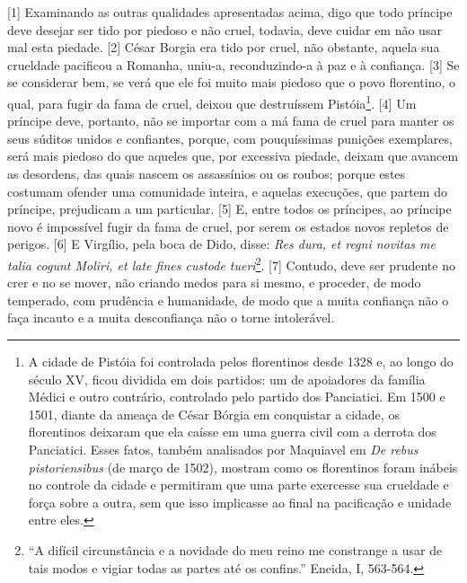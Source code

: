 {[}1{]} Examinando as outras qualidades apresentadas acima, digo que
todo príncipe deve desejar ser tido por piedoso e não cruel, todavia,
deve cuidar em não usar mal esta piedade. {[}2{]} César Borgia era tido
por cruel, não obstante, aquela sua crueldade pacificou a Romanha,
uniu-a, reconduzindo-a à paz e à confiança. {[}3{]} Se se considerar
bem, se verá que ele foi muito mais piedoso que o povo florentino, o
qual, para fugir da fama de cruel, deixou que destruíssem
Pistóia\footnote{A cidade de Pistóia foi controlada pelos florentinos
  desde 1328 e, ao longo do século XV, ficou dividida em dois partidos:
  um de apoiadores da família Médici e outro contrário, controlado pelo
  partido dos Panciatici. Em 1500 e 1501, diante da ameaça de César
  Bórgia em conquistar a cidade, os florentinos deixaram que ela caísse
  em uma guerra civil com a derrota dos Panciatici. Esses fatos, também
  analisados por Maquiavel em \emph{De rebus pistoriensibus} (de março
  de 1502), mostram como os florentinos foram inábeis no controle da
  cidade e permitiram que uma parte exercesse sua crueldade e força
  sobre a outra, sem que isso implicasse ao final na pacificação e
  unidade entre eles.}. {[}4{]} Um príncipe deve, portanto, não se
importar com a má fama de cruel para manter os seus súditos unidos e
confiantes, porque, com pouquíssimas punições exemplares, será mais
piedoso do que aqueles que, por excessiva piedade, deixam que avancem as
desordens, das quais nascem os assassínios ou os roubos; porque estes
costumam ofender uma comunidade inteira, e aquelas execuções, que partem
do príncipe, prejudicam a um particular. {[}5{]} E, entre todos os
príncipes, ao príncipe novo é impossível fugir da fama de cruel, por
serem os estados novos repletos de perigos. {[}6{]} E Virgílio, pela
boca de Dido, disse: \emph{Res dura, et regni novitas me talia cogunt
Moliri, et late fines custode tueri}\footnote{``A difícil circunstância
  e a novidade do meu reino me constrange a usar de tais modos e vigiar
  todas as partes até os confins.'' Eneida, I, 563-564.}. {[}7{]}
Contudo, deve ser prudente no crer e no se mover, não criando medos para
si mesmo, e proceder, de modo temperado, com prudência e humanidade, de
modo que a muita confiança não o faça incauto e a muita desconfiança não
o torne intolerável.

